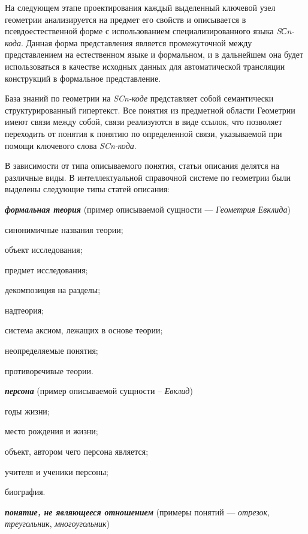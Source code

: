 На следующем этапе проектирования каждый выделенный ключевой узел геометрии анализируется на предмет его свойств и описывается в псевдоестественной форме с использованием специализированного языка \textit{SСn-кода}. Данная форма представления является промежуточной между представлением на естественном языке и формальном, и в дальнейшем она будет использоваться в качестве исходных данных для автоматической трансляции конструкций в формальное представление.

База знаний по геометрии на \textit{SCn-коде} представляет собой семантически структурированный гипертекст. Все понятия из предметной области Геометрии имеют связи между собой, связи реализуются в виде ссылок, что позволяет переходить от понятия к понятию по определенной связи, указываемой при помощи ключевого слова \textit{SCn-кода}.

В зависимости от типа описываемого понятия, статьи описания делятся на различные виды. В интеллектуальной справочной системе по геометрии были выделены следующие типы статей описания:

\textbf{\textit{формальная теория}} (пример описываемой сущности --- \textit{Геометрия Евклида})

\begin{textitemize}
	\item синонимичные названия теории;
	\item объект исследования;
	\item предмет исследования;
	\item декомпозиция на разделы;
	\item надтеория;
	\item система аксиом, лежащих в основе теории;
	\item неопределяемые понятия;
	\item противоречивые теории.
\end{textitemize}

\textbf{\textit{персона}} (пример описываемой сущности -- \textit{Евклид})

\begin{textitemize}
	\item годы жизни;
	\item место рождения и жизни;
	\item объект, автором чего персона является;
	\item учителя и ученики персоны;
	\item биография.
\end{textitemize}

\textbf{\textit{понятие, не являющееся отношением}} (примеры понятий --- \textit{отрезок}, \textit{треугольник}, \textit{многоугольник})

